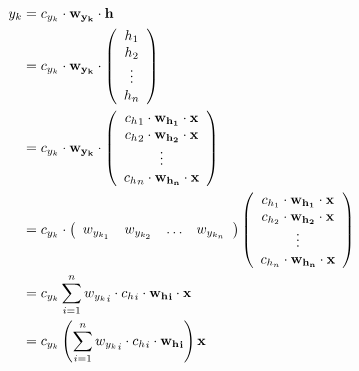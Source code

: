 \documentclass{article}
\begin{document}
\begin{enumerate}
\begin{enumerate}
\begin{align*}
                    y_k
                        &= c_{y_k} \cdot \bf{w_{y_k}} \cdot \bf{h} \\
                        &= c_{y_k} \cdot \bf{w_{y_k}} \cdot
                            \left( \begin{array}{c}
                            h_1 \\
                            h_2 \\
                            \vdots \\
                            h_n 
                            \end{array} \right) \\
                        &= c_{y_k} \cdot \bf{w_{y_k}} \cdot 
                            \left( \begin{array}{c}
                            {c_h}_1 \cdot \bf{w_{h_1}} \cdot \bf{x} \\
                            {c_h}_2 \cdot \bf{w_{h_2}} \cdot \bf{x} \\
                            \vdots \\
                            {c_h}_n \cdot \bf{w_{h_n}} \cdot \bf{x}
                            \end{array} \right) \\
                        &= c_{y_k} \cdot 
                            \left( \begin{array}{cccc}
                            w_{y_{k_1}} & w_{y_{k_2}} & \hdots & w_{y_{k_n}}
                            \end{array} \right)
                            \left( \begin{array}{c}
                                c_{h_1} \cdot \bf{w_{h_1}} \cdot \bf{x} \\
                                c_{h_2} \cdot \bf{w_{h_2}} \cdot \bf{x} \\
                                \vdots \\
                                c_{h_n} \cdot \bf{w_{h_n}} \cdot \bf{x}
                            \end{array} \right) \\
                        &= c_{y_k} \sum\limits_{i=1}^n {w_{y_k}}_i \cdot {c_h}_i 
                            \cdot \bf{{w_h}_i} \cdot \bf{x} \\
                        &= c_{y_k} \left( \sum\limits_{i=1}^n {w_{y_k}}_i 
                            \cdot {c_h}_i \cdot \bf{{w_h}_i} \right) \bf{x}
                \end{align*}

\end{enumerate}
\end{enumerate}
\end{document}
